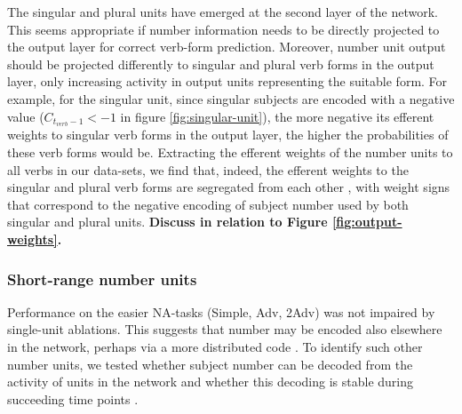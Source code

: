 The singular and plural units have emerged at the second layer of the network. This seems appropriate if number information needs to be directly projected to the output layer for correct verb-form prediction. Moreover, number unit output should be projected differently to singular and plural verb forms in the output layer, only increasing activity in output units representing the suitable form. For example, for the singular unit, since singular subjects are encoded with a negative value ($C_{t_{verb}-1}<-1$ in figure \ref{fig:singular-unit}), the more negative its efferent weights to singular verb forms in the output layer, the higher the probabilities of these verb forms would be. Extracting the efferent weights of the number units to all verbs in our data-sets, we find that, indeed, the efferent weights to the singular and plural verb forms are segregated from each other , with weight signs that correspond to the negative encoding of subject number used by both singular and plural units. \textbf{Discuss in relation to Figure \ref{fig:output-weights}.}

\subsubsection{Short-range number units}
Performance on the easier NA-tasks (Simple, Adv, 2Adv) was not impaired by single-unit ablations. This suggests that number may be encoded also elsewhere in the network, perhaps via a more distributed code \cite[see][for similar observations]{Giulianelli:etal:2018}. To identify such other number units, we tested whether subject number can be decoded from the activity of units in the network and whether this decoding is stable during succeeding time points  \cite[see][for similar observations and related methods]{Giulianelli:etal:2018}.

